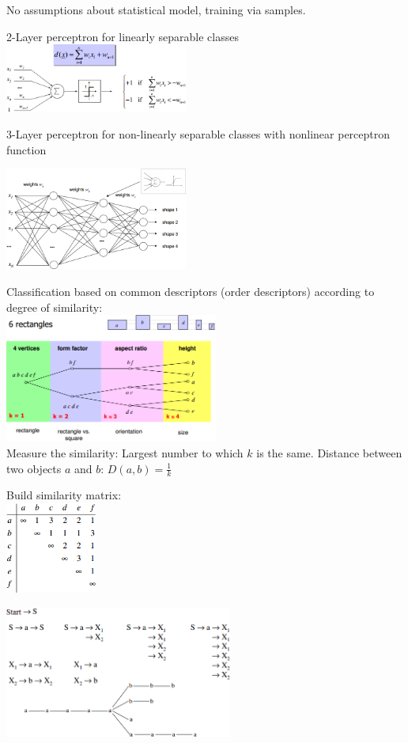   \begin{minipage}{10cm}
  
      No assumptions about statistical model, training via samples.
      
      2-Layer perceptron for linearly separable classes
      \includegraphics[width=6cm]{./images/2layer-perceptron.png}
      
      3-Layer perceptron for non-linearly separable classes with nonlinear perceptron function
      
      \includegraphics[width=6cm]{./images/multilayer-perceptron.png}
      
      Classification based on common descriptors (order descriptors) according to degree of similarity:\\
      \includegraphics[width=7cm]{./images/common_features.png}\\
      Measure the similarity: Largest number to which $k$ is the same.
      Distance between two objects $a$ and $b$: $D(a,b) = \frac{1}{k}$
      
      Build similarity matrix:\\
      \includegraphics[width=3cm]{./images/similarity_matrix.png}
  \end{minipage}

    \includegraphics[width=7.5cm]{./images/grammar.png}
      